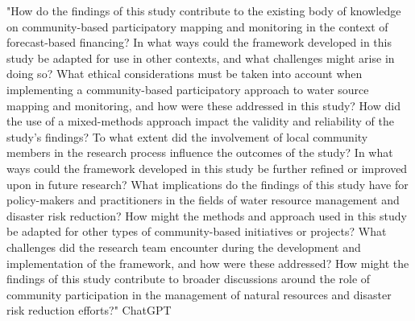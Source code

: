 "How do the findings of this study contribute to the existing body of knowledge on community-based participatory mapping and monitoring in the context of forecast-based financing?
In what ways could the framework developed in this study be adapted for use in other contexts, and what challenges might arise in doing so?
What ethical considerations must be taken into account when implementing a community-based participatory approach to water source mapping and monitoring, and how were these addressed in this study?
How did the use of a mixed-methods approach impact the validity and reliability of the study's findings?
To what extent did the involvement of local community members in the research process influence the outcomes of the study?
In what ways could the framework developed in this study be further refined or improved upon in future research?
What implications do the findings of this study have for policy-makers and practitioners in the fields of water resource management and disaster risk reduction?
How might the methods and approach used in this study be adapted for other types of community-based initiatives or projects?
What challenges did the research team encounter during the development and implementation of the framework, and how were these addressed?
How might the findings of this study contribute to broader discussions around the role of community participation in the management of natural resources and disaster risk reduction efforts?" ChatGPT










